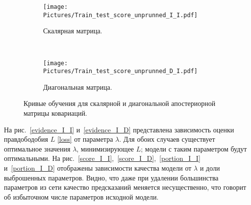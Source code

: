 \documentclass[12pt, fleqn, unicode]{article}
\begin{document}
\begin{figure}[!h]
	\vspace{-1mm}
	\centering
	\begin{subfigure}[!tp]{0.7\textwidth}
		\texttt{[image: Pictures/Train\_test\_score\_unprunned\_I\_I.pdf]}
		\caption{Скалярная матрица.}
		\label{training_I_I}
	\end{subfigure}
	~
	\hspace{-2mm}
	\begin{subfigure}[!htbp]{0.7\textwidth}
		\texttt{[image: Pictures/Train\_test\_score\_unprunned\_D\_I.pdf]}
		\caption{Диагональная матрица.}
		\label{training_D_I}
	\end{subfigure}
	\caption{Кривые обучения для скалярной и диагональной апостериорной матрицы ковариаций.}
	\label{asdasd}
\end{figure}



На рис.~\ref{evidence_I_I} и~\ref{evidence_I_D} представлена зависимость оценки правдободобия $L$ \eqref{loss} от параметра $\lambda$.
Для обоих случаев существует оптимальное значения $\lambda$, минимизирующее $L$; модели с таким параметром будут оптимальными. На рис.~\ref{score_I_I},~\ref{score_I_D},~\ref{portion_I_I} и~\ref{portion_I_D} отображены зависимости качества модели от $\lambda$ и доли выброшенных параметров. Видно, что даже при удалении большинства параметров из сети качество предсказаний меняется несущественно, что говорит об избыточном числе параметров исходной модели.
\end{document}
